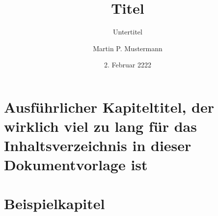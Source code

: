 \documentclass[arbeit=master,oneside]{ArbeitRST}
\begin{document}
\author{Martin P. Mustermann}
\title{Titel}
\subtitle{Untertitel}
\date{2. Februar 2222}
\maketitle
\selbststaendigkeitserklaerung
\tableofcontents





\chapter[kurzer Titel]{Ausführlicher Kapiteltitel, der wirklich viel zu lang für das Inhaltsverzeichnis in dieser Dokumentvorlage ist}
\blindtext[6]
\chapter{Beispielkapitel}
\blindtext[4]
\end{document}
